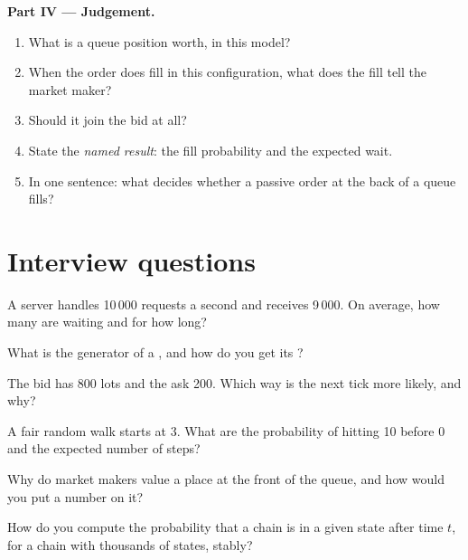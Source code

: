 \begin{problem}
\medskip\noindent\textbf{Part IV --- Judgement.}
\begin{enumerate}[resume]
\item What is a queue position worth, in this model?
\item When the order does fill in this configuration, what does the fill tell the market maker?
\item Should it join the bid at all?
\item State the \emph{named result}: the fill probability and the expected wait.
\item In one sentence: what decides whether a passive order at the back of a queue fills?
\end{enumerate}
\end{problem}

\section{Interview questions}

\begin{interviewq}\label{iq:qm:markov-chains-and-queues:1}
A server handles 10\,000 requests a second and receives 9\,000. On average, how many are waiting and for how long?
\end{interviewq}

\begin{interviewq}\label{iq:qm:markov-chains-and-queues:2}
What is the generator of a , and how do you get its ?
\end{interviewq}

\begin{interviewq}\label{iq:qm:markov-chains-and-queues:3}
The bid has 800 lots and the ask 200. Which way is the next tick more likely, and why?
\end{interviewq}

\begin{interviewq}\label{iq:qm:markov-chains-and-queues:4}
A fair random walk starts at 3. What are the probability of hitting 10 before 0 and the expected number of steps?
\end{interviewq}

\begin{interviewq}\label{iq:qm:markov-chains-and-queues:5}
Why do market makers value a place at the front of the queue, and how would you put a number on it?
\end{interviewq}

\begin{interviewq}\label{iq:qm:markov-chains-and-queues:6}
How do you compute the probability that a chain is in a given state after time $t$, for a chain with thousands
of states, stably?
\end{interviewq}
